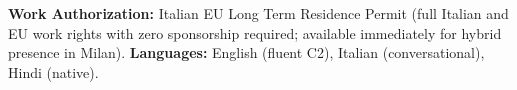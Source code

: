 \documentclass[a4paper,10pt]{article}
\begin{document}
\vspace{2pt}
{\small \textbf{Work Authorization:} Italian EU Long Term Residence Permit (full Italian and EU work rights with zero sponsorship required; available immediately for hybrid presence in Milan). \quad \textbf{Languages:} English (fluent C2), Italian (conversational), Hindi (native).}
\end{document}
